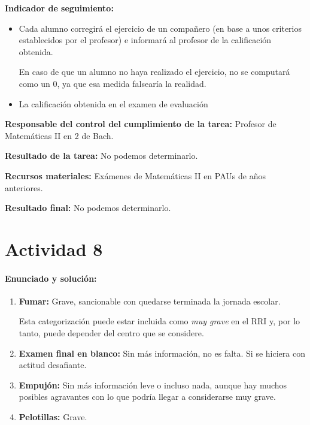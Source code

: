{\textbf{Indicador de seguimiento:}
\vspace{-0.3cm}
\begin{itemize}
	\item Cada alumno corregirá el ejercicio de un compañero (en base a unos criterios establecidos por el profesor) e informará al profesor de la calificación obtenida.

	\subitem En caso de que un alumno no haya realizado el ejercicio, no se computará como un 0, ya que esa medida falsearía la realidad.

	\item La calificación obtenida en el examen de evaluación 
\end{itemize}

\textbf{Responsable del control del cumplimiento de la tarea:}
Profesor de Matemáticas II en 2 de Bach.


\textbf{Resultado de la tarea:}
No podemos determinarlo.


\textbf{Recursos materiales:}
Exámenes de Matemáticas II en PAUs de años anteriores.


\textbf{Resultado final:}
No podemos determinarlo.



\newpage
\section*{Actividad 8}
\paragraph{Enunciado y solución:}

\begin{enumerate}
	\item \textbf{Fumar: } Grave, sancionable con quedarse terminada la jornada escolar.

	\subitem Esta categorización puede estar incluida como \textit{muy grave} en el RRI y, por lo tanto, puede depender del centro que se considere.

	\item \textbf{Examen final en blanco: } Sin más información, no es falta.
 Si se hiciera con actitud desafiante.

	\item \textbf{Empujón: } Sin más información leve o incluso nada, aunque hay muchos posibles agravantes con lo que podría llegar a considerarse muy grave.

	\item \textbf{Pelotillas: } Grave.


\end{enumerate}}
